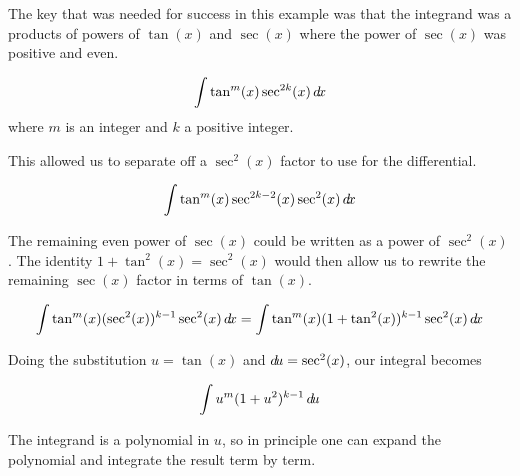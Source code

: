 \documentclass{ximera}
\begin{document}
The key that was needed for success in this example was that the integrand was a products of powers of $\tan(x)$ and $\sec(x)$ where the power of $\sec(x)$ was positive and even.

\[
\int \tan^{m}(x) \sec^{2k}(x) \mathop{}\!d\! x
\]
where $m$ is an integer and $k$ a positive integer. 

 This allowed us to separate off a $\sec^{2}(x)$ factor to use for the differential. 

\[
\int \tan^{m}(x)\sec^{2k-2}(x) \sec^{2}(x) \mathop{}\!d\! x
\]

The remaining even power of $\sec(x)$ could be written as a power of $\sec^{2}(x)$. The identity $1+\tan^{2}(x)=\sec^{2}(x)$
would then allow us to rewrite the remaining $\sec(x)$ factor in terms of $\tan(x)$. 

\[
\int \tan^{m}(x) ( \sec^{2}(x))^{k-1} \sec^{2}(x) \mathop{}\!d\! x=\int \tan^{m}(x) (1+\tan^{2}(x))^{k-1} \sec^{2}(x) \mathop{}\!d\! x
\]

Doing the substitution $u=\tan(x)$ and $\mathop{}\!d\! u=\sec^{2}(x)$, our integral becomes 

\[
\int u^{m}(1+u^{2})^{k-1} \mathop{}\!d\! u
\]

The integrand is a polynomial in $u$, so in principle one can expand the polynomial and integrate the result term by term.
\end{document}
